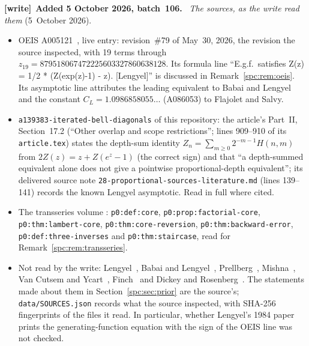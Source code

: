 \documentclass[11pt,letterpaper]{article}
\theoremstyle{definition}\newtheorem{definition}[theorem]{Definition}
\theoremstyle{remark}\newtheorem{remark}[theorem]{Remark}
\newcommand{\file}[1]{\nolinkurl{#1}}
\newenvironment{writenote}[1][]{\par\smallskip\begingroup\small
 \noindent\textbf{[write]}\if\relax\detokenize{#1}\relax\else~\textbf{#1.}\fi\ }%
 {\par\endgroup\smallskip}
\begin{document}
\begin{writenote}[Added 5 October 2026, batch~106]
\emph{The sources, as the write read them} (5~October 2026).
\begin{itemize}
\item OEIS A005121~\cite{OEIS}, live entry: revision~\#79 of May~30, 2026,
 the revision the source inspected, with 19 terms through
 $z_{19}=879518067472225603327860638128$. Its formula line ``E.g.f.\
 satisfies Z(z) = 1/2 * (Z(exp(z)-1) - z). [Lengyel]'' is discussed in
 Remark~\ref{spc:rem:oeis}. Its asymptotic line attributes the leading
 equivalent to Babai and Lengyel and the constant
 $C_L=1.0986858055\ldots$ (A086053) to Flajolet and Salvy.
\item \file{a139383-iterated-bell-diagonals} of this repository: the
 article's Part~II, Section~17.2 (``Other overlap and scope restrictions'';
 lines 909--910 of its \file{article.tex}) states the depth-sum identity
 $Z_n=\sum_{m\ge0}2^{-m-1}H(n,m)$ from $2Z(z)=z+Z(e^z-1)$ (the correct
 sign) and that ``a depth-summed equivalent alone does not give a pointwise
 proportional-depth equivalent''; its delivered source note
 \file{28-proportional-sources-literature.md} (lines 139--141) records the
 known Lengyel asymptotic. Read in full where cited.
\item The transseries volume
 :
 \file{p0:def:core}, \file{p0:prop:factorial-core},
 \file{p0:thm:lambert-core}, \file{p0:thm:core-reversion},
 \file{p0:thm:backward-error}, \file{p0:def:three-inverses} and
 \file{p0:thm:staircase}, read for Remark~\ref{spc:rem:transseries}.
\item Not read by the write: Lengyel~\cite{Lengyel}, Babai and
 Lengyel~\cite{BabaiLengyel}, Prellberg~\cite{Prellberg},
 Mishna~\cite{Mishna}, Van Cutsem and Ycart~\cite{VanCutsemYcart},
 Finch~\cite{Finch} and Dickey and Rosenberg~\cite{DickeyRosenberg}. The
 statements made about them in Section~\ref{spc:sec:prior} are the
 source's; \file{data/SOURCES.json} records what the source inspected, with
 SHA-256 fingerprints of the files it read. In particular, whether
 Lengyel's 1984 paper prints the generating-function equation with the sign
 of the OEIS line was not checked.
\end{itemize}


\end{writenote}
\end{document}
